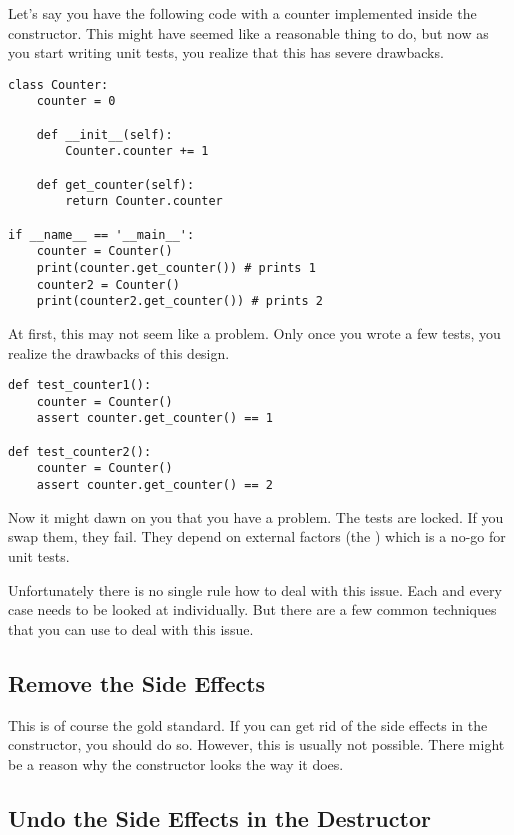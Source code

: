 Let's say you have the following code with a counter implemented inside the constructor. This might have seemed like a reasonable thing to do, but now as you start writing unit tests, you realize that this has severe drawbacks.

\begin{programcode}{}
\begin{verbatim}
class Counter:
    counter = 0

    def __init__(self):
        Counter.counter += 1

    def get_counter(self):
        return Counter.counter

if __name__ == '__main__':
    counter = Counter()
    print(counter.get_counter()) # prints 1
    counter2 = Counter()
    print(counter2.get_counter()) # prints 2
\end{verbatim}
\end{programcode}

At first, this may not seem like a problem. Only once you wrote a few tests, you realize the drawbacks of this design.

\begin{programcode}{}
\begin{verbatim}
def test_counter1():
    counter = Counter()
    assert counter.get_counter() == 1

def test_counter2():
    counter = Counter()
    assert counter.get_counter() == 2
\end{verbatim}
\end{programcode}

Now it might dawn on you that you have a problem. The tests are locked. If you swap them, they fail. They depend on external factors (the ) which is a no-go for unit tests.

Unfortunately there is no single rule how to deal with this issue. Each and every case needs to be looked at individually. But there are a few common techniques that you can use to deal with this issue.

\subsection{Remove the Side Effects}

This is of course the gold standard. If you can get rid of the side effects in the constructor, you should do so. However, this is usually not possible. There might be a reason why the constructor looks the way it does.

\subsection{Undo the Side Effects in the Destructor}

